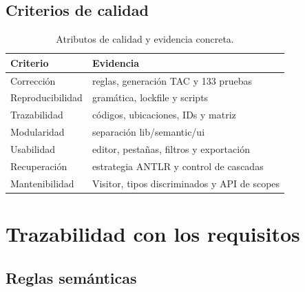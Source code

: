 \documentclass[11pt,letterpaper,oneside]{report}
\begin{document}
\section{Criterios de calidad}

\begin{table}[H]
\centering
\begin{tabularx}{\textwidth}{lY}
\toprule
Criterio & Evidencia \\
\midrule
Corrección & reglas, generación TAC y 133 pruebas \\
Reproducibilidad & gramática, lockfile y scripts \\
Trazabilidad & códigos, ubicaciones, IDs y matriz \\
Modularidad & separación lib/semantic/ui \\
Usabilidad & editor, pestañas, filtros y exportación \\
Recuperación & estrategia ANTLR y control de cascadas \\
Mantenibilidad & Visitor, tipos discriminados y API de scopes \\
\bottomrule
\end{tabularx}
\caption{Atributos de calidad y evidencia concreta.}
\end{table}

\chapter{Trazabilidad con los requisitos}

\section{Reglas semánticas}
\end{document}
